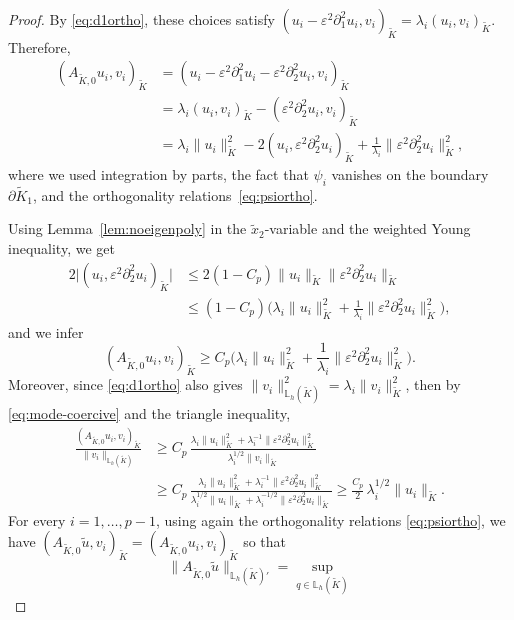 \documentclass[10pt,a4paper]{amsart}
\newcommand{\AKO}{{A_{\tilde K,0}}}
\newcommand{\Kt}{\widetilde{K}}
\newcommand{\eps}{\varepsilon}
\begin{document}
\begin{proof}
	By \eqref{eq:d1ortho}, these choices satisfy
	$ (u_i-\eps^2\partial_1^2u_i,v_i)_{\Kt} = \lambda_i(u_i,v_i)_{\Kt}$.
	Therefore,
	\begin{align*}
	(\AKO u_i,v_i)_{\Kt}
	&=
	(u_i-\eps^2\partial_1^2u_i-\eps^2\partial_2^2u_i,v_i)_{\Kt}
	\\
	&=
	\lambda_i(u_i,v_i)_{\Kt}
	-(\eps^2\partial_2^2u_i,v_i)_{\Kt}
	\\
	&=
	\lambda_i\|u_i\|_{\Kt}^2
	-2(u_i,\eps^2\partial_2^2u_i)_{\Kt}
	+\frac{1}{\lambda_i}\|\eps^2\partial_2^2u_i\|_{\Kt}^2,
	\end{align*}
	where we used integration by parts, the fact that $\psi_i$ vanishes on the boundary $\partial \Kt_1$, and the 
    orthogonality relations~\eqref{eq:psiortho}.
	
	Using Lemma~\ref{lem:noeigenpoly} in the \(\widetilde x_2\)-variable and the weighted Young inequality, we get
	\begin{align*}
	2\big|(u_i,\eps^2\partial_2^2u_i)_{\Kt}\big|
	&\le
	2(1-C_p)\|u_i\|_{\Kt}
	\|\eps^2\partial_2^2u_i\|_{\Kt}
	\\
	&\le
	(1-C_p)
	\Big(
	\lambda_i\|u_i\|_{\Kt}^2
	+\frac1{\lambda_i}\|\eps^2\partial_2^2u_i\|_{\Kt}^2
	\Big),
	\end{align*}
	and we infer
	\begin{equation}\label{eq:mode-coercive}
	(\AKO u_i,v_i)_{\Kt}
	\ge
	C_p
	\Big(
	\lambda_i\|u_i\|_{\Kt}^2
	+\frac1{\lambda_i}\|\eps^2\partial_2^2u_i\|_{\Kt}^2
	\Big).
	\end{equation}
	Moreover, since \eqref{eq:d1ortho} also gives $ \|v_i\|_{\mathbb L_h(\Kt)}^2 = \lambda_i\|v_i\|_{\Kt}^2$,
	 then by \eqref{eq:mode-coercive} and the triangle inequality, 
	\begin{align*}
	\frac{(\AKO u_i,v_i)_{\Kt}}{\|v_i\|_{\mathbb L_h(\Kt)}}
	&\ge
	C_p\,
	\frac{
	\lambda_i\|u_i\|_{\Kt}^2
	+\lambda_i^{-1}\|\eps^2\partial_2^2u_i\|_{\Kt}^2
	}{
	\lambda_i^{1/2}\|v_i\|_{\Kt}
	}
	\\
	&\ge
	C_p\,
	\frac{
	\lambda_i\|u_i\|_{\Kt}^2
	+\lambda_i^{-1}\|\eps^2\partial_2^2u_i\|_{\Kt}^2
	}{
	\lambda_i^{1/2}\|u_i\|_{\Kt}
	+\lambda_i^{-1/2}\|\eps^2\partial_2^2u_i\|_{\Kt}
	}
	\ge
	\frac{C_p}{2}\,\lambda_i^{1/2}\|u_i\|_{\Kt}.
	\end{align*}
	For every $i=1,\dots,p-1$, using again the orthogonality relations \eqref{eq:psiortho}, we have
	$
	(\AKO \tilde u,v_i)_{\Kt}
	=
	(\AKO u_i,v_i)_{\Kt}
	$
so that
	\begin{equation*}
	\|\AKO\tilde u\|_{\mathbb L_h(\Kt)'}
	=
	\sup_{q\in \mathbb L_h(\Kt)}

\end{equation*}
\end{proof}
\end{document}
